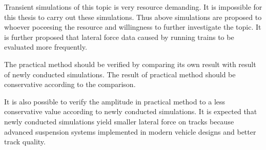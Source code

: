 Transient simulations of this topic is very resource demanding. It is impossible for this thesis to carry out these simulations. Thus above simulations are proposed to whoever poceesing the resource and willingness to further investigate the topic. It is further proposed that lateral force data caused by running trains to be evaluated more frequently.

The practical method should be verified by comparing its own result with result of newly conducted simulations. The result of practical method should be conservative according to the comparison. 

It is also possible to verify the amplitude in practical method to a less conservative value according to newly conducted simulations. It is expected that newly conducted simulations yield smaller lateral force on tracks because advanced suspension systems implemented in modern vehicle designs and better track quality. 

